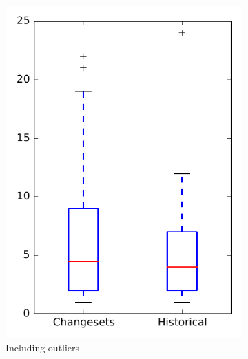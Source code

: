 
\begin{figure}
    \centering
    \begin{subfigure}{.4\textwidth}
        \centering
        \includegraphics[height=0.4\textheight]{figures/dit/rq2_tika}
        \caption{Including outliers}\label{fig:dit:rq2:tika_outlier}
    \end{subfigure}%
    \begin{subfigure}{.4\textwidth}
        \centering

\end{subfigure}
\end{figure}

